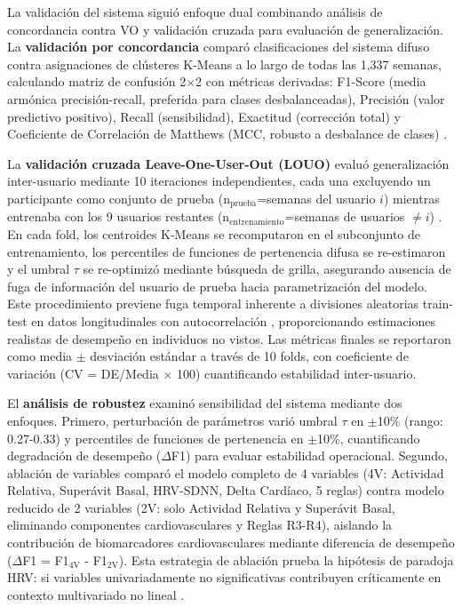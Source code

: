 \documentclass[journal,twoside,web]{ieeecolor}
\begin{document}
La validación del sistema siguió enfoque dual combinando análisis de concordancia contra VO y validación cruzada para evaluación de generalización. La \textbf{validación por concordancia} comparó clasificaciones del sistema difuso contra asignaciones de clústeres K-Means a lo largo de todas las 1,337 semanas, calculando matriz de confusión 2$\times$2 con métricas derivadas: F1-Score (media armónica precisión-recall, preferida para clases desbalanceadas), Precisión (valor predictivo positivo), Recall (sensibilidad), Exactitud (corrección total) y Coeficiente de Correlación de Matthews (MCC, robusto a desbalance de clases) \cite{Chicco2020,Powers2020}.

La \textbf{validación cruzada Leave-One-User-Out (LOUO)} evaluó generalización inter-usuario mediante 10 iteraciones independientes, cada una excluyendo un participante como conjunto de prueba (n$_{\text{prueba}}$=semanas del usuario $i$) mientras entrenaba con los 9 usuarios restantes (n$_{\text{entrenamiento}}$=semanas de usuarios $\neq i$) \cite{Varoquaux2017,Poldrack2020}. En cada fold, los centroides K-Means se recomputaron en el subconjunto de entrenamiento, los percentiles de funciones de pertenencia difusa se re-estimaron y el umbral $\tau$ se re-optimizó mediante búsqueda de grilla, asegurando ausencia de fuga de información del usuario de prueba hacia parametrización del modelo. Este procedimiento previene fuga temporal inherente a divisiones aleatorias train-test en datos longitudinales con autocorrelación \cite{Rehman2024LOSO}, proporcionando estimaciones realistas de desempeño en individuos no vistos. Las métricas finales se reportaron como media $\pm$ desviación estándar a través de 10 folds, con coeficiente de variación (CV = DE/Media $\times$ 100) cuantificando estabilidad inter-usuario.

El \textbf{análisis de robustez} examinó sensibilidad del sistema mediante dos enfoques. Primero, perturbación de parámetros varió umbral $\tau$ en $\pm$10\% (rango: 0.27-0.33) y percentiles de funciones de pertenencia en $\pm$10\%, cuantificando degradación de desempeño ($\Delta$F1) para evaluar estabilidad operacional. Segundo, ablación de variables comparó el modelo completo de 4 variables (4V: Actividad Relativa, Superávit Basal, HRV-SDNN, Delta Cardíaco, 5 reglas) contra modelo reducido de 2 variables (2V: solo Actividad Relativa y Superávit Basal, eliminando componentes cardiovasculares y Reglas R3-R4), aislando la contribución de biomarcadores cardiovasculares mediante diferencia de desempeño ($\Delta$F1 = F1$_{\text{4V}}$ - F1$_{\text{2V}}$). Esta estrategia de ablación prueba la hipótesis de paradoja HRV: si variables univariadamente no significativas contribuyen críticamente en contexto multivariado no lineal \cite{Godkin2025Context,Marino2024ARIC}.
\end{document}

